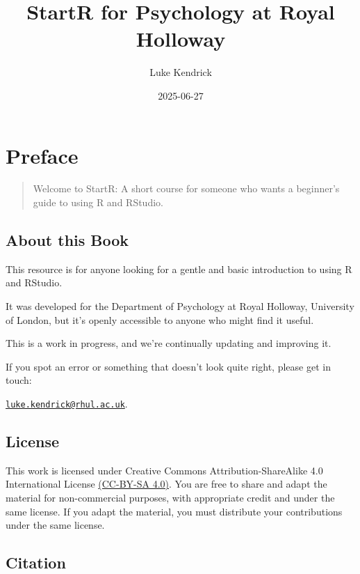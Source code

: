\documentclass[
]{book}
\title{StartR for Psychology at Royal Holloway}
\author{Luke Kendrick}
\date{2025-06-27}
\let\oldsection\section
\renewcommand{\section}{\needspace{5\baselineskip}\oldsection}
\begin{document}
\maketitle

{
\setcounter{tocdepth}{1}
\tableofcontents
}
\chapter*{Preface}\label{preface}

\begin{quote}
Welcome to StartR: A short course for someone who wants a beginner's guide to using R and RStudio.
\end{quote}

\section{About this Book}\label{about-this-book}

This resource is for anyone looking for a gentle and basic introduction to using R and RStudio.

It was developed for the Department of Psychology at Royal Holloway, University of London, but it's openly accessible to anyone who might find it useful.

This is a work in progress, and we're continually updating and improving it.

If you spot an error or something that doesn't look quite right, please get in touch:

\href{mailto:luke.kendrick@rhul.ac.uk}{\nolinkurl{luke.kendrick@rhul.ac.uk}}.

\section{\texorpdfstring{\textbf{License}}{License}}\label{license}

This work is licensed under Creative Commons Attribution-ShareAlike 4.0 International License \href{https://creativecommons.org/licenses/by-sa/4.0/}{(CC-BY-SA 4.0)}. You are free to share and adapt the material for non-commercial purposes, with appropriate credit and under the same license. If you adapt the material, you must distribute your contributions under the same license.

\section{\texorpdfstring{\textbf{Citation}}{Citation}}\label{citation}
\end{document}
